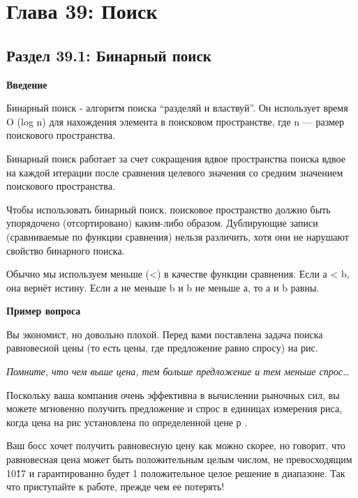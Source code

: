
\chapter*{Глава 39: Поиск}
\section*{Раздел 39.1: Бинарный поиск}

\vspace{\baselineskip}
\textbf{Введение}

\vspace{\baselineskip}
Бинарный поиск - алгоритм поиска “разделяй и властвуй”. Он использует время O (log n) для нахождения элемента в поисковом пространстве, где n ---  размер поискового пространства. 

\vspace{\baselineskip}
Бинарный поиск работает за счет сокращения вдвое пространства поиска вдвое на каждой итерации после сравнения целевого значения со средним значением поискового пространства.

\vspace{\baselineskip}
Чтобы использовать бинарный поиск, поисковое пространство должно быть упорядочено (отсортировано) каким-либо образом. Дублирующие записи (сравниваемые по функции сравнения) нельзя различить, хотя они не нарушают свойство бинарного	 поиска.

\vspace{\baselineskip}
Обычно мы используем меньше (<) в качестве функции сравнения. Если а < b, она вернёт истину. Если а не меньше b и b не меньше а, то а и b равны.

\vspace{\baselineskip}
\textbf{Пример вопроса}
\vspace{\baselineskip}

Вы экономист, но довольно плохой. Перед вами поставлена задача поиска равновесной цены (то есть цены, где предложение равно спросу) на рис. 

\textit{Помните, что чем выше цена, тем больше предложение и тем меньше спрос…}

Поскольку ваша компания очень эффективна в вычислении рыночных сил, вы можете мгновенно получить предложение и спрос в единицах измерения риса, когда цена на рис установлена по определенной цене р . 

Ваш босс хочет получить равновесную цену как можно скорее, но говорит, что равновесная цена может быть положительным целым числом, не превосходящим 10\^17 и гарантированно будет 1 положительное целое решение в диапазоне. Так что приступайте к работе, прежде чем ее потерять! 

